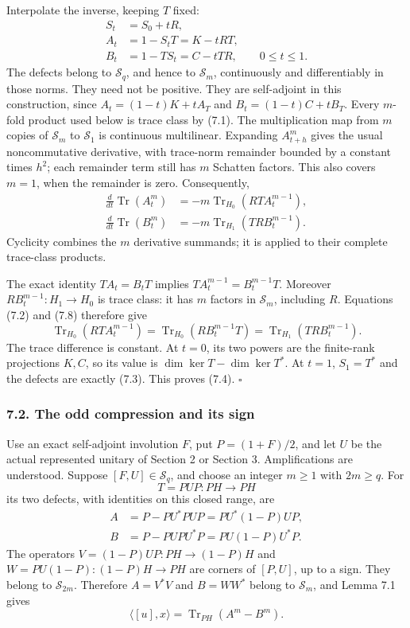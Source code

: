 \documentclass[
  11pt,
]{article}
\begin{document}
Interpolate the inverse, keeping \(T\) fixed: \[
\begin{split}
 S_t&=S_0+tR,\\
 A_t&=1-S_tT=K-tRT,\\
 B_t&=1-TS_t=C-tTR,\qquad 0\leq t\leq1 .
\end{split}
 \tag{7.7}
\] The defects belong to \(\mathcal S_q\), and hence to
\(\mathcal S_m\), continuously and differentiably in those norms. They
need not be positive. They are self-adjoint in this construction, since
\(A_t=(1-t)K+tA_T\) and \(B_t=(1-t)C+tB_T\). Every \(m\)-fold product
used below is trace class by (7.1). The multiplication map from \(m\)
copies of \(\mathcal S_m\) to \(\mathcal S_1\) is continuous
multilinear. Expanding \(A_{t+h}^m\) gives the usual noncommutative
derivative, with trace-norm remainder bounded by a constant times
\(h^2\); each remainder term still has \(m\) Schatten factors. This also
covers \(m=1\), when the remainder is zero. Consequently, \[
\begin{split}
 \frac d{dt}\operatorname{Tr}(A_t^m)
   &=-m\operatorname{Tr}_{H_0}(RT A_t^{m-1}),\\
 \frac d{dt}\operatorname{Tr}(B_t^m)
   &=-m\operatorname{Tr}_{H_1}(TR B_t^{m-1}).
\end{split}
 \tag{7.8}
\] Cyclicity combines the \(m\) derivative summands; it is applied to
their complete trace-class products.

The exact identity \(TA_t=B_tT\) implies \(TA_t^{m-1}=B_t^{m-1}T\).
Moreover \(RB_t^{m-1}:H_1\to H_0\) is trace class: it has \(m\) factors
in \(\mathcal S_m\), including \(R\). Equations (7.2) and (7.8)
therefore give \[
 \operatorname{Tr}_{H_0}(RT A_t^{m-1})
   =\operatorname{Tr}_{H_0}(RB_t^{m-1}T)
   =\operatorname{Tr}_{H_1}(TR B_t^{m-1}).
\] The trace difference is constant. At \(t=0\), its two powers are the
finite-rank projections \(K,C\), so its value is
\(\dim\ker T-\dim\ker T^*\). At \(t=1\), \(S_1=T^*\) and the defects are
exactly (7.3). This proves (7.4). \(\square\)

\subsubsection{7.2. The odd compression and its
sign}\label{the-odd-compression-and-its-sign}

Use an exact self-adjoint involution \(F\), put \(P=(1+F)/2\), and let
\(U\) be the actual represented unitary of Section 2 or Section 3.
Amplifications are understood. Suppose \([F,U]\in\mathcal S_q\), and
choose an integer \(m\geq1\) with \(2m\geq q\). For \[
 T=PUP:PH\longrightarrow PH
\] its two defects, with identities on this closed range, are \[
\begin{split}
 A&=P-PU^*PUP=PU^*(1-P)UP,\\
 B&=P-PUPU^*P=PU(1-P)U^*P .
\end{split}
 \tag{7.9}
\] The operators \(V=(1-P)UP:PH\to(1-P)H\) and
\(W=PU(1-P):(1-P)H\to PH\) are corners of \([P,U]\), up to a sign. They
belong to \(\mathcal S_{2m}\). Therefore \(A=V^*V\) and \(B=WW^*\)
belong to \(\mathcal S_m\), and Lemma 7.1 gives \[
 \langle[u],x\rangle=\operatorname{Tr}_{PH}(A^m-B^m).
 \tag{7.10}
\]
\end{document}

